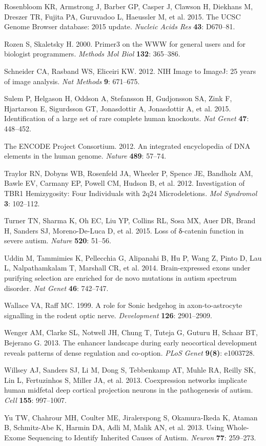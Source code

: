 \documentclass[]{article}
\begin{document}
Rosenbloom KR, Armstrong J, Barber GP, Casper J, Clawson H, Diekhans M,
Dreszer TR, Fujita PA, Guruvadoo L, Haeussler M, et al. 2015. The UCSC
Genome Browser database: 2015 update. \emph{Nucleic Acids Res}
\textbf{43}: D670--81.

Rozen S, Skaletsky H. 2000. Primer3 on the WWW for general users and for
biologist programmers. \emph{Methods Mol Biol} \textbf{132}: 365--386.

Schneider CA, Rasband WS, Eliceiri KW. 2012. NIH Image to ImageJ: 25
years of image analysis. \emph{Nat Methods} \textbf{9}: 671--675.

Sulem P, Helgason H, Oddson A, Stefansson H, Gudjonsson SA, Zink F,
Hjartarson E, Sigurdsson GT, Jonasdottir A, Jonasdottir A, et al. 2015.
Identification of a large set of rare complete human knockouts.
\emph{Nat Genet} \textbf{47}: 448--452.

The ENCODE Project Consortium. 2012. An integrated encyclopedia of DNA
elements in the human genome. \emph{Nature} \textbf{489}: 57--74.

Traylor RN, Dobyns WB, Rosenfeld JA, Wheeler P, Spence JE, Bandholz AM,
Bawle EV, Carmany EP, Powell CM, Hudson B, et al. 2012. Investigation of
TBR1 Hemizygosity: Four Individuals with 2q24 Microdeletions. \emph{Mol
Syndromol} \textbf{3}: 102--112.

Turner TN, Sharma K, Oh EC, Liu YP, Collins RL, Sosa MX, Auer DR, Brand
H, Sanders SJ, Moreno-De-Luca D, et al. 2015. Loss of δ-catenin function
in severe autism. \emph{Nature} \textbf{520}: 51--56.

Uddin M, Tammimies K, Pellecchia G, Alipanahi B, Hu P, Wang Z, Pinto D,
Lau L, Nalpathamkalam T, Marshall CR, et al. 2014. Brain-expressed exons
under purifying selection are enriched for de novo mutations in autism
spectrum disorder. \emph{Nat Genet} \textbf{46}: 742--747.

Wallace VA, Raff MC. 1999. A role for Sonic hedgehog in
axon-to-astrocyte signalling in the rodent optic nerve.
\emph{Development} \textbf{126}: 2901--2909.

Wenger AM, Clarke SL, Notwell JH, Chung T, Tuteja G, Guturu H, Schaar
BT, Bejerano G. 2013. The enhancer landscape during early neocortical
development reveals patterns of dense regulation and co-option.
\emph{PLoS Genet} \textbf{9(8)}: e1003728.

Willsey AJ, Sanders SJ, Li M, Dong S, Tebbenkamp AT, Muhle RA, Reilly
SK, Lin L, Fertuzinhos S, Miller JA, et al. 2013. Coexpression networks
implicate human midfetal deep cortical projection neurons in the
pathogenesis of autism. \emph{Cell} \textbf{155}: 997--1007.

Yu TW, Chahrour MH, Coulter ME, Jiralerspong S, Okamura-Ikeda K, Ataman
B, Schmitz-Abe K, Harmin DA, Adli M, Malik AN, et al. 2013. Using
Whole-Exome Sequencing to Identify Inherited Causes of Autism.
\emph{Neuron} \textbf{77}: 259--273.
\end{document}
